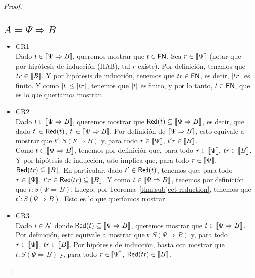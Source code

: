 \begin{proof}
  \subsection*{\( A = \Psi \Rightarrow B \)}
    \begin{itemize}
      \item CR1
        \\ Dado \( t \in \llbracket\Psi \Rightarrow B\rrbracket \), queremos mostrar que \( t \in \mathsf{FN} \). Sea \( r \in \llbracket\Psi\rrbracket \) (notar que por hipótesis de inducción (HAB), tal \( r \) existe). Por definición, tenemos que \( t r \in \llbracket B\rrbracket \).
        Y por hipótesis de inducción, tenemos que \( t r \in \mathsf{FN} \), es decir, \( |t r| \) es finito.
        Y como \( |t| \leq |t r| \), tenemos que \( |t| \) es finito, y por lo tanto, \( t \in \mathsf{FN} \), que es lo que queríamos mostrar.
      \item CR2
        \\ Dado \( t \in \llbracket\Psi \Rightarrow B\rrbracket \), queremos mostrar que \( \mathsf{Red} (t) \subseteq \llbracket\Psi \Rightarrow B\rrbracket \), es decir, que dado \( t' \in \mathsf{Red} (t) \), \( t' \in \llbracket\Psi \Rightarrow B\rrbracket \). Por definición de \( \llbracket\Psi \Rightarrow B\rrbracket \), esto equivale a mostrar que \( t' : S(\Psi \Rightarrow B) \) y, para todo \( r \in \llbracket\Psi\rrbracket \), \( t' r \in \llbracket B\rrbracket \).
        \\ Como \( t \in \llbracket\Psi \Rightarrow B\rrbracket \), tenemos por definición que, para todo \( r \in \llbracket\Psi\rrbracket \), \( t r \in \llbracket B\rrbracket \). Y por hipótesis de inducción, esto implica que, para todo \( r \in \llbracket\Psi\rrbracket \), \( \mathsf{Red} (t r) \subseteq \llbracket B\rrbracket \). En particular, dado \( t' \in \mathsf{Red} (t) \), tenemos que, para todo \( r \in \llbracket\Psi\rrbracket \), \( t' r \in \mathsf{Red} (t r) \subseteq \llbracket B\rrbracket \). Y como \( t \in \llbracket\Psi \Rightarrow B\rrbracket \), tenemos por definición que \( t : S(\Psi \Rightarrow B) \). Luego, por Teorema~\ref{thm:subject-reduction}, tenemos que \( t' : S(\Psi \Rightarrow B) \). Esto es lo que queríamos mostrar.
      \item CR3
        \\ Dado \( t \in \mathcal{N} \) donde \( \mathsf{Red} (t) \subseteq \llbracket\Psi \Rightarrow B\rrbracket \), queremos mostrar que \( t \in \llbracket\Psi \Rightarrow B\rrbracket \). Por definición, esto equivale a mostrar que \( t : S(\Psi \Rightarrow B) \) y, para todo \( r \in \llbracket\Psi\rrbracket \), \( t r \in \llbracket B\rrbracket \). Por hipótesis de inducción, basta con mostrar que \( t : S(\Psi \Rightarrow B) \) y, para todo \( r \in \llbracket\Psi\rrbracket \), \( \mathsf{Red} (t r) \in \llbracket B\rrbracket \).

\end{itemize}
\end{proof}
